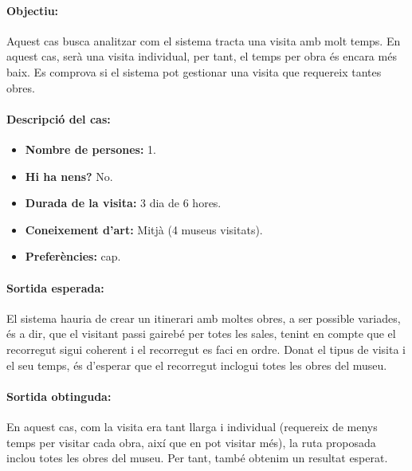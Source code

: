 \documentclass[a4paper]{article}
\begin{document}
	\paragraph{Objectiu:} 
	Aquest cas busca analitzar com el sistema tracta una visita amb molt temps. En aquest cas, serà una visita individual, per tant, el temps per obra és encara més baix. Es comprova si el sistema pot gestionar una visita que requereix tantes obres.
	
	\paragraph{Descripció del cas:} 
	
	\begin{itemize}
		\item \textbf{Nombre de persones:} 1.
		\item \textbf{Hi ha nens?} No.
		\item \textbf{Durada de la visita:} 3 dia de 6 hores.
		\item \textbf{Coneixement d’art:} Mitjà (4 museus visitats).
		\item \textbf{Preferències:} cap.
	\end{itemize}
	
	\paragraph{Sortida esperada:}
	El sistema hauria de crear un itinerari amb moltes obres, a ser possible variades, és a dir, que el visitant passi gairebé per totes les sales, tenint en compte que el recorregut sigui coherent i el recorregut es faci en ordre. Donat el tipus de visita i el seu temps, és d'esperar que el recorregut inclogui totes les obres del museu.
	
	\paragraph{Sortida obtinguda:}
	En aquest cas, com la visita era tant llarga i individual (requereix de menys temps per visitar cada obra, així que en pot visitar més), la ruta proposada inclou totes les obres del museu. Per tant, també obtenim un resultat esperat.
	
\end{document}
